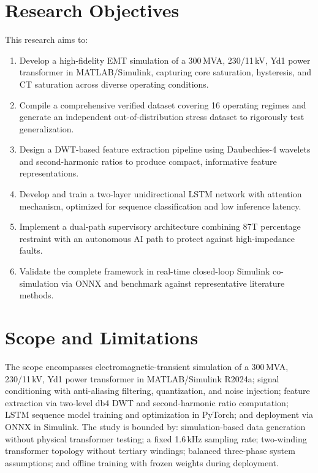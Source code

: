\documentclass[12pt,a4paper,oneside]{report}
\begin{document}
\section{Research Objectives}
This research aims to:
\begin{enumerate}[leftmargin=1.6em,itemsep=2pt]
\item Develop a high-fidelity EMT simulation of a 300\,MVA, 230/11\,kV, Yd1 power transformer in MATLAB/Simulink, capturing core saturation, hysteresis, and CT saturation across diverse operating conditions.
\item Compile a comprehensive verified dataset covering 16 operating regimes and generate an independent out-of-distribution stress dataset to rigorously test generalization.
\item Design a DWT-based feature extraction pipeline using Daubechies-4 wavelets and second-harmonic ratios to produce compact, informative feature representations.
\item Develop and train a two-layer unidirectional LSTM network with attention mechanism, optimized for sequence classification and low inference latency.
\item Implement a dual-path supervisory architecture combining 87T percentage restraint with an autonomous AI path to protect against high-impedance faults.
\item Validate the complete framework in real-time closed-loop Simulink co-simulation via ONNX and benchmark against representative literature methods.
\end{enumerate}

\section{Scope and Limitations}
The scope encompasses electromagnetic-transient simulation of a 300\,MVA, 230/11\,kV, Yd1 power transformer in MATLAB/Simulink R2024a; signal conditioning with anti-aliasing filtering, quantization, and noise injection; feature extraction via two-level db4 DWT and second-harmonic ratio computation; LSTM sequence model training and optimization in PyTorch; and deployment via ONNX in Simulink. The study is bounded by: simulation-based data generation without physical transformer testing; a fixed 1.6\,kHz sampling rate; two-winding transformer topology without tertiary windings; balanced three-phase system assumptions; and offline training with frozen weights during deployment.
\end{document}
